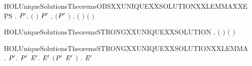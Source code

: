 \begin{SaveVerbatim}{HOLUniqueSolutionsTheoremsOBSXXUNIQUEXXSOLUTIONXXLEMMAXXEPS}
\HOLTokenTurnstile{} \HOLSymConst{\HOLTokenForall{}}.
         \HOLSymConst{\HOLTokenConj{}}   \HOLSymConst{\HOLTokenImp{}}
       \HOLSymConst{\HOLTokenForall{}} \ensuremath{\HOLBoundVar{P}\sp{\prime}}.
            \ensuremath{(} \ensuremath{)} \ensuremath{\HOLBoundVar{P}\sp{\prime}} \HOLSymConst{\HOLTokenImp{}}
           \HOLSymConst{\HOLTokenExists{}}.   \HOLSymConst{\HOLTokenConj{}}   \HOLSymConst{\HOLTokenConj{}} \ensuremath{(}\ensuremath{\HOLBoundVar{P}\sp{\prime}} \HOLSymConst{\ensuremath{=}}  \ensuremath{)} \HOLSymConst{\HOLTokenConj{}} \HOLSymConst{\HOLTokenForall{}}.  \ensuremath{(} \ensuremath{)} \ensuremath{(} \ensuremath{)}
\end{SaveVerbatim}
\newcommand{\HOLUniqueSolutionsTheoremsOBSXXUNIQUEXXSOLUTIONXXLEMMAXXEPS}{\UseVerbatim{HOLUniqueSolutionsTheoremsOBSXXUNIQUEXXSOLUTIONXXLEMMAXXEPS}}
\begin{SaveVerbatim}{HOLUniqueSolutionsTheoremsSTRONGXXUNIQUEXXSOLUTION}
\HOLTokenTurnstile{} \HOLSymConst{\HOLTokenForall{}}  .
         \HOLSymConst{\HOLTokenConj{}}   \ensuremath{(} \ensuremath{)} \HOLSymConst{\HOLTokenConj{}}   \ensuremath{(} \ensuremath{)} \HOLSymConst{\HOLTokenImp{}}
         
\end{SaveVerbatim}
\newcommand{\HOLUniqueSolutionsTheoremsSTRONGXXUNIQUEXXSOLUTION}{\UseVerbatim{HOLUniqueSolutionsTheoremsSTRONGXXUNIQUEXXSOLUTION}}
\begin{SaveVerbatim}{HOLUniqueSolutionsTheoremsSTRONGXXUNIQUEXXSOLUTIONXXLEMMA}
\HOLTokenTurnstile{} \HOLSymConst{\HOLTokenForall{}}.
         \HOLSymConst{\HOLTokenImp{}}
       \HOLSymConst{\HOLTokenForall{}}  \ensuremath{\HOLBoundVar{P}\sp{\prime}}.
             \HOLTokenTransBegin{}\HOLTokenTransEnd \ensuremath{\HOLBoundVar{P}\sp{\prime}} \HOLSymConst{\HOLTokenImp{}}
           \HOLSymConst{\HOLTokenExists{}}\ensuremath{\HOLBoundVar{E}\sp{\prime}}.  \ensuremath{\HOLBoundVar{E}\sp{\prime}} \HOLSymConst{\HOLTokenConj{}} \ensuremath{(}\ensuremath{\HOLBoundVar{P}\sp{\prime}} \HOLSymConst{\ensuremath{=}} \ensuremath{\HOLBoundVar{E}\sp{\prime}} \ensuremath{)} \HOLSymConst{\HOLTokenConj{}} \HOLSymConst{\HOLTokenForall{}}.   \HOLTokenTransBegin{}\HOLTokenTransEnd \ensuremath{\HOLBoundVar{E}\sp{\prime}} 
\end{SaveVerbatim}
